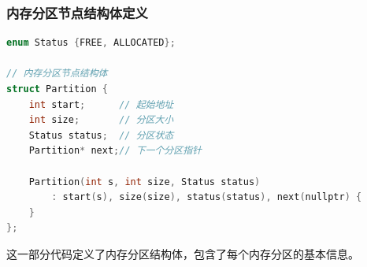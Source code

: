 \documentclass[UTF8]{ctexart}
\begin{document}
\subsubsection{内存分区节点结构体定义}
\begin{lstlisting}[frame=shadowbox, language=C]
enum Status {FREE, ALLOCATED};

// 内存分区节点结构体
struct Partition {
    int start;      // 起始地址
    int size;       // 分区大小
    Status status;  // 分区状态
    Partition* next;// 下一个分区指针

    Partition(int s, int size, Status status)
        : start(s), size(size), status(status), next(nullptr) {
    }
};
\end{lstlisting}

这一部分代码定义了内存分区结构体，包含了每个内存分区的基本信息。
\end{document}
